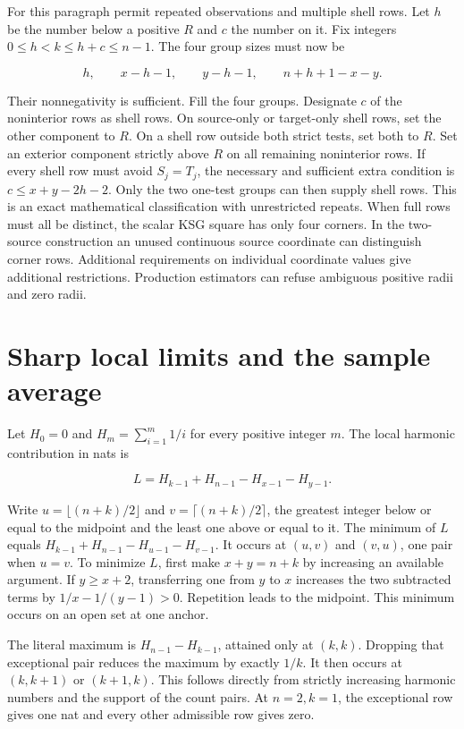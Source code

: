 For this paragraph permit repeated observations and multiple shell rows. Let \(h\) be the number below a positive \(R\) and \(c\) the number on it. Fix integers \(0\le h<k\le h+c\le n-1\). The four group sizes must now be

\[
h,\qquad x-h-1,\qquad y-h-1,\qquad n+h+1-x-y.
\]

Their nonnegativity is sufficient. Fill the four groups. Designate \(c\) of the noninterior rows as shell rows. On source-only or target-only shell rows, set the other component to \(R\). On a shell row outside both strict tests, set both to \(R\). Set an exterior component strictly above \(R\) on all remaining noninterior rows. If every shell row must avoid \(S_j=T_j\), the necessary and sufficient extra condition is \(c\le x+y-2h-2\). Only the two one-test groups can then supply shell rows. This is an exact mathematical classification with unrestricted repeats. When full rows must all be distinct, the scalar KSG square has only four corners. In the two-source construction an unused continuous source coordinate can distinguish corner rows. Additional requirements on individual coordinate values give additional restrictions. Production estimators can refuse ambiguous positive radii and zero radii.

\section{Sharp local limits and the sample average}\label{sharp-local-limits-and-the-sample-average}

Let \(H_0=0\) and \(H_m=\sum_{i=1}^m1/i\) for every positive integer \(m\). The local harmonic contribution in nats is

\[
L=H_{k-1}+H_{n-1}-H_{x-1}-H_{y-1}.
\]

Write \(u=\lfloor(n+k)/2\rfloor\) and \(v=\lceil(n+k)/2\rceil\), the greatest integer below or equal to the midpoint and the least one above or equal to it. The minimum of \(L\) equals \(H_{k-1}+H_{n-1}-H_{u-1}-H_{v-1}\). It occurs at \((u,v)\) and \((v,u)\), one pair when \(u=v\). To minimize \(L\), first make \(x+y=n+k\) by increasing an available argument. If \(y\ge x+2\), transferring one from \(y\) to \(x\) increases the two subtracted terms by \(1/x-1/(y-1)>0\). Repetition leads to the midpoint. This minimum occurs on an open set at one anchor.

The literal maximum is \(H_{n-1}-H_{k-1}\), attained only at \((k,k)\). Dropping that exceptional pair reduces the maximum by exactly \(1/k\). It then occurs at \((k,k+1)\) or \((k+1,k)\). This follows directly from strictly increasing harmonic numbers and the support of the count pairs. At \(n=2,k=1\), the exceptional row gives one nat and every other admissible row gives zero.

